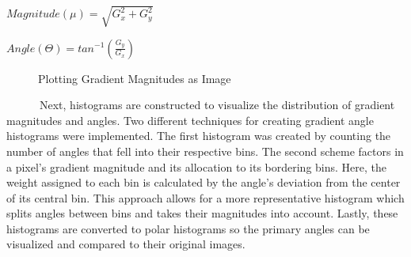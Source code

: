 \documentclass[
  letterpaper,
  DIV=11,
  numbers=noendperiod]{scrreprt}
\begin{document}
\(Magnitude(\mu)=\sqrt{G_{x}^{2} + G_{y}^{2}}\)

\(Angle(\Theta)=tan^{−1} (\frac{G_y}{G_x})\)

\begin{figure}

\begin{minipage}{\linewidth}
\end{minipage}%
\newline
\begin{minipage}{\linewidth}



\end{minipage}%

\caption{\label{fig-mag_plot}Plotting Gradient Magnitudes as Image}

\end{figure}%

\hfill\break
~~~~~~Next, histograms are constructed to visualize the distribution of
gradient magnitudes and angles. Two different techniques for creating
gradient angle histograms were implemented. The first histogram was
created by counting the number of angles that fell into their respective
bins. The second scheme factors in a pixel's gradient magnitude and its
allocation to its bordering bins. Here, the weight assigned to each bin
is calculated by the angle's deviation from the center of its central
bin. This approach allows for a more representative histogram which
splits angles between bins and takes their magnitudes into account.
Lastly, these histograms are converted to polar histograms so the
primary angles can be visualized and compared to their original images.
\end{document}
